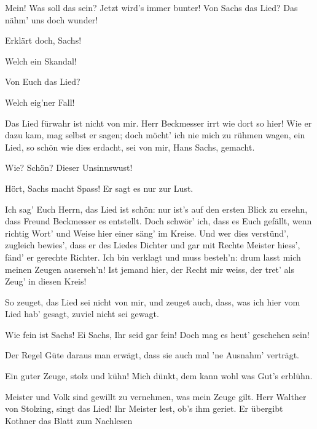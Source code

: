 \begin{drama}
Mein! Was soll das sein? Jetzt wird's immer bunter!
Von Sachs das Lied? Das nähm' uns doch wunder!

\Kothnerspeaks
Erklärt doch, Sachs!

\Nachtigallspeaks
Welch ein Skandal!

\Vogelgesangspeaks
Von Euch das Lied?

Welch eig'ner Fall!

\Sachsspeaks


Das Lied fürwahr ist nicht von mir.
Herr Beckmesser irrt wie dort so hier!
Wie er dazu kam, mag selbst er sagen;
doch möcht' ich nie mich zu rühmen wagen,
ein Lied, so schön wie dies erdacht,
sei von mir, Hans Sachs, gemacht.

Wie? Schön? Dieser Unsinnswust!

Hört, Sachs macht Spass! Er sagt es nur zur Lust.

\Sachsspeaks
Ich sag' Euch Herrn, das Lied ist schön:
nur ist's auf den ersten Blick zu ersehn,
dass Freund Beckmesser es entstellt.
Doch schwör' ich, dass es Euch gefällt,
wenn richtig Wort' und Weise
hier einer säng' im Kreise.
Und wer dies verstünd', zugleich bewies',
dass er des Liedes Dichter
und gar mit Rechte Meister hiess',
fänd' er gerechte Richter.
Ich bin verklagt und muss besteh'n:
drum lasst mich meinen Zeugen auserseh'n!
Ist jemand hier, der Recht mir weiss,
der tret' als Zeug' in diesen Kreis!


So zeuget, das Lied sei nicht von mir,
und zeuget auch, dass, was ich hier
vom Lied hab' gesagt, zuviel nicht sei gewagt.

Wie fein ist Sachs! Ei Sachs, Ihr seid gar fein!
Doch mag es heut' geschehen sein!

\Sachsspeaks
Der Regel Güte daraus man erwägt,
dass sie auch mal 'ne Ausnahm' verträgt.

Ein guter Zeuge, stolz und kühn!
Mich dünkt, dem kann wohl was Gut's erblühn.

\Sachsspeaks
Meister und Volk sind gewillt
zu vernehmen, was mein Zeuge gilt.
Herr Walther von Stolzing, singt das Lied!
Ihr Meister lest, ob's ihm geriet.
Er übergibt Kothner das Blatt zum Nachlesen


\end{drama}
